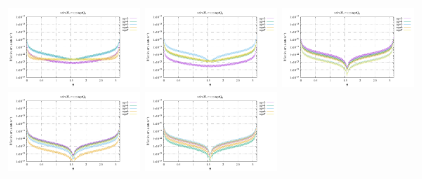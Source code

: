 \noindent
\includegraphics[width=3.5cm]{python_codes/fieldstone_152/RESULTS/exp1/sr2_64_m2}
\includegraphics[width=3.5cm]{python_codes/fieldstone_152/RESULTS/exp1/sr2_64_m3}
\includegraphics[width=3.5cm]{python_codes/fieldstone_152/RESULTS/exp1/sr2_64_m4}
\includegraphics[width=3.5cm]{python_codes/fieldstone_152/RESULTS/exp1/sr2_64_m5}
\includegraphics[width=3.5cm]{python_codes/fieldstone_152/RESULTS/exp1/sr2_64_m6}

